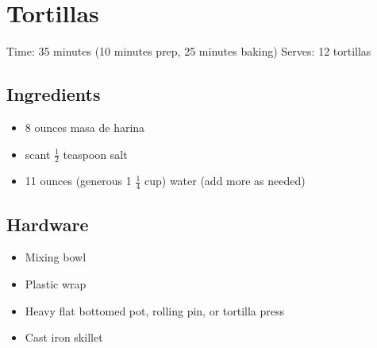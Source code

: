 \section{Tortillas}
\label{tortillas}
\setcounter{secnumdepth}{0}
Time: 35 minutes (10 minutes prep, 25 minutes baking)
Serves: 12 tortillas

\begin{multicols}{2}
\subsection*{Ingredients}
\begin{itemize}
    \item 8 ounces masa de harina
    \item scant \( \frac{1}{2} \) teaspoon salt
    \item 11 ounces (generous 1 \( \frac{1}{4} \) cup) water (add more as needed)
\end{itemize}

\subsection*{Hardware}
\begin{itemize}
    \item Mixing bowl
    \item Plastic wrap
    \item Heavy flat bottomed pot, rolling pin, or tortilla press
    \item Cast iron skillet

\end{itemize}
\clearpage


\end{multicols}

